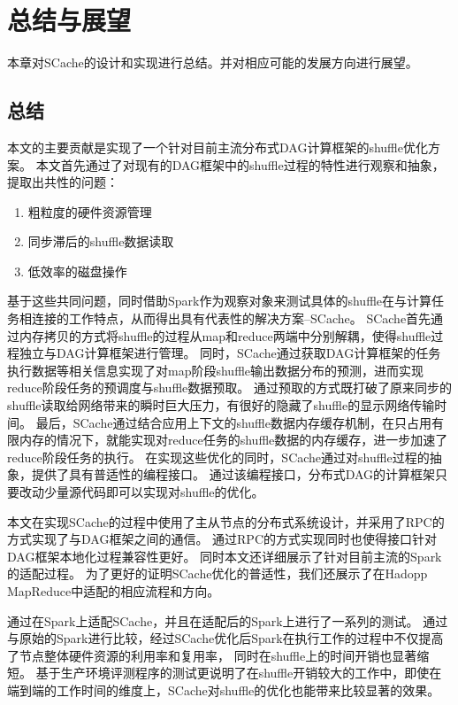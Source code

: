 
\chapter{总结与展望}
\label{chap:summary}

本章对SCache的设计和实现进行总结。并对相应可能的发展方向进行展望。

\section{总结}

本文的主要贡献是实现了一个针对目前主流分布式DAG计算框架的shuffle优化方案。
本文首先通过了对现有的DAG框架中的shuffle过程的特性进行观察和抽象，提取出共性的问题：
\begin{enumerate}
    \item 粗粒度的硬件资源管理
    \item 同步滞后的shuffle数据读取
    \item 低效率的磁盘操作
\end{enumerate}
基于这些共同问题，同时借助Spark作为观察对象来测试具体的shuffle在与计算任务相连接的工作特点，从而得出具有代表性的解决方案--SCache。
SCache首先通过内存拷贝的方式将shuffle的过程从map和reduce两端中分别解耦，使得shuffle过程独立与DAG计算框架进行管理。
同时，SCache通过获取DAG计算框架的任务执行数据等相关信息实现了对map阶段shuffle输出数据分布的预测，进而实现reduce阶段任务的预调度与shuffle数据预取。
通过预取的方式既打破了原来同步的shuffle读取给网络带来的瞬时巨大压力，有很好的隐藏了shuffle的显示网络传输时间。
最后，SCache通过结合应用上下文的shuffle数据内存缓存机制，在只占用有限内存的情况下，就能实现对reduce任务的shuffle数据的内存缓存，进一步加速了reduce阶段任务的执行。
在实现这些优化的同时，SCache通过对shuffle过程的抽象，提供了具有普适性的编程接口。
通过该编程接口，分布式DAG的计算框架只要改动少量源代码即可以实现对shuffle的优化。

本文在实现SCache的过程中使用了主从节点的分布式系统设计，并采用了RPC的方式实现了与DAG框架之间的通信。
通过RPC的方式实现同时也使得接口针对DAG框架本地化过程兼容性更好。
同时本文还详细展示了针对目前主流的Spark的适配过程。
为了更好的证明SCache优化的普适性，我们还展示了在Hadopp MapReduce中适配的相应流程和方向。

通过在Spark上适配SCache，并且在适配后的Spark上进行了一系列的测试。
通过与原始的Spark进行比较，经过SCache优化后Spark在执行工作的过程中不仅提高了节点整体硬件资源的利用率和复用率，
同时在shuffle上的时间开销也显著缩短。
基于生产环境评测程序的测试更说明了在shuffle开销较大的工作中，即使在端到端的工作时间的维度上，SCache对shuffle的优化也能带来比较显著的效果。

